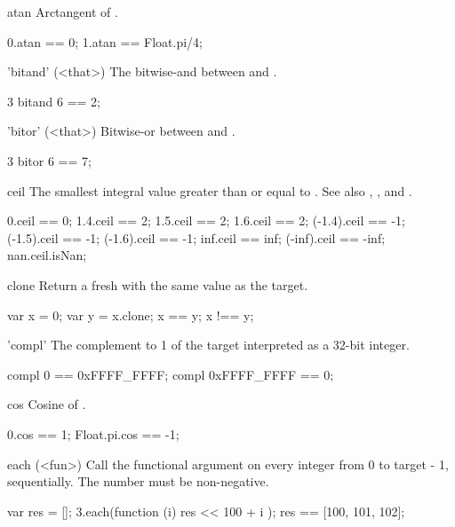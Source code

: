 \begin{urbiscriptapi}
\item[atan] Arctangent of \this.
\begin{urbiassert}
0.atan == 0;
1.atan == Float.pi/4;
\end{urbiassert}


\item['bitand'](<that>)%
  The bitwise-and between \this and .
\begin{urbiassert}
3 bitand 6 == 2;
\end{urbiassert}


\item['bitor'](<that>)%
  Bitwise-or between \this and .
\begin{urbiassert}
3 bitor 6 == 7;
\end{urbiassert}


\item[ceil] The smallest integral value greater than or equal to \this.  See
  also , , and .
\begin{urbiassert}
     0.ceil ==  0;
   1.4.ceil ==  2;     1.5.ceil ==  2;    1.6.ceil ==  2;
(-1.4).ceil == -1;  (-1.5).ceil == -1; (-1.6).ceil == -1;
   inf.ceil == inf; (-inf).ceil == -inf;
   nan.ceil.isNan;
\end{urbiassert}


\item[clone]
  Return a fresh  with the same value as the target.
\begin{urbiassert}
var x = 0;
var y = x.clone;
x == y;  x !== y;
\end{urbiassert}


\item['compl']
  The complement to 1 of the target interpreted as a 32-bit integer.
\begin{urbiassert}
compl 0 == 0xFFFF_FFFF;    compl 0xFFFF_FFFF == 0;
\end{urbiassert}


\item[cos]
  Cosine of \this.
\begin{urbiassert}
0.cos == 1;   Float.pi.cos == -1;
\end{urbiassert}


\item[each](<fun>)%
  Call the functional argument  on every integer from 0 to
  target - 1, sequentially.  The number must be non-negative.
\begin{urbiassert}
{
  var res = [];
  3.each(function (i) { res << 100 + i });
  res
}
== [100, 101, 102];


\end{urbiassert}
\end{urbiscriptapi}
